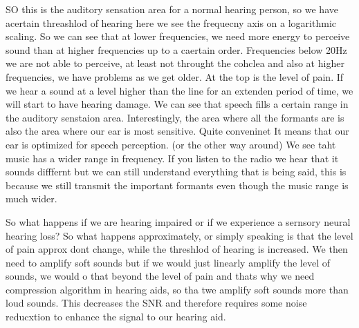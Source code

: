 SO this is the auditory sensation area for a normal hearing person, so we have acertain threashlod of hearing here we see the frequecny axis on a logarithmic scaling. So we can see that at lower frequencies, we need more energy to perceive sound than at higher frequencies up to a caertain order.  Frequencies below 20Hz we are not able to perceive, at least not throught the cohclea and also at higher frequencies, we have problems as we get older. At the top is the level of pain. If we hear a sound at a level higher than the line for an extenden period of time, we will start to have hearing damage. We can see that speech fills a certain range in the auditory senstaion area.   Interestingly, the area where all the formants are is also the area where our ear is most sensitive. Quite conveninet It means that our ear is optimized for speech perception. (or the other way around) We see taht music has a wider range in frequency.  If you listen to the radio we hear that it sounds difffernt but we can still understand everything that is being said, this is because we still transmit the important formants even though the music range is much wider.

So what happens if we are hearing impaired or if we experience a sernsory neural hearing loss? So what happens approximately, or simply speaking is that the level of pain approx dont change, while the threshlod of hearing is increased.  We then need to amplify soft sounds but if we would just linearly amplify the level of sounds, we would o that beyond the level of pain and thats why we need compression algorithm in hearing aids, so tha twe amplify soft sounds more than loud sounds.  This decreases the SNR and therefore requires some noise reducxtion to enhance the signal to our hearing aid. 

